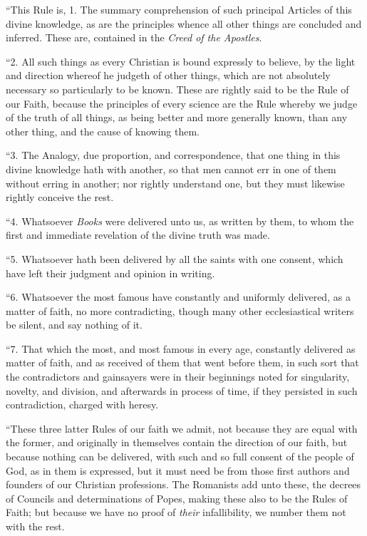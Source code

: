 ``This
Rule is, 1. The summary comprehension of such principal Articles of this
divine knowledge, as are the principles whence all other things are
concluded and inferred. These are, contained in the \emph{Creed of the
Apostles}.

``2.
All such things as every Christian is bound expressly to believe, by the
light and direction whereof he judgeth of other things, which are not
absolutely necessary so particularly to be known. These are rightly said
to be the Rule of our Faith, because the principles of every science are
the Rule whereby we judge of the truth of all things, as being better
and more generally known, than any other thing, and the cause of knowing
them.

``3.
The Analogy, due proportion, and correspondence, that one thing in this
divine knowledge hath with another, so that men cannot err in one of
them without erring in another; nor rightly understand one, but they
must likewise rightly conceive the rest.

``4.
Whatsoever \emph{Books} were delivered unto us, as written by them, to
whom the first and immediate revelation of the divine truth was made.

``5.
Whatsoever hath been delivered by all the saints with one consent, which
have left their judgment and opinion in writing.

``6.
Whatsoever the most famous have constantly and uniformly delivered, as a
matter of faith, no more contradicting, though many other ecclesiastical
writers be silent, and say nothing of it.

``7.
That which the most, and most famous in every age, constantly delivered
as matter of faith, and as received of them that went before them, in
such sort that the contradictors and gainsayers were in their beginnings
noted for singularity, novelty, and division, and afterwards
in
process of time, if they persisted in such contradiction, charged with
heresy.

``These
three latter Rules of our faith we admit, not because they are equal
with the former, and originally in themselves contain the direction of
our faith, but because nothing can be delivered, with such and so full
consent of the people of God, as in them is expressed, but it must need
be from those first authors and founders of our Christian professions.
The Romanists add unto these, the decrees of Councils and determinations
of Popes, making these also to be the Rules of Faith; but because we
have no proof of \emph{their} infallibility, we number them not with the
rest.

